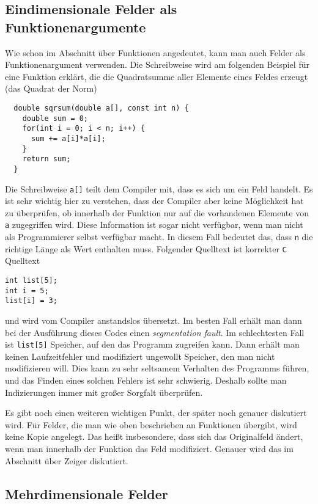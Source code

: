 \subsection{Eindimensionale Felder als Funktionenargumente}

Wie schon im Abschnitt über Funktionen angedeutet, kann man auch Felder als Funktionenargument verwenden.
Die Schreibweise wird am folgenden Beispiel für eine Funktion erklärt, die die Quadratsumme aller Elemente eines Feldes erzeugt (das Quadrat der Norm)
\begin{lstlisting}
  double sqrsum(double a[], const int n) {
    double sum = 0;
    for(int i = 0; i < n; i++) {
      sum += a[i]*a[i];
    }
    return sum;
  }
\end{lstlisting}
Die Schreibweise \texttt{a[]} teilt dem Compiler mit, dass es sich um ein Feld handelt.
Es ist sehr wichtig hier zu verstehen, dass der Compiler aber keine Möglichkeit hat zu überprüfen, ob innerhalb der Funktion nur auf die vorhandenen Elemente von \texttt{a} zugegriffen wird.
Diese Information ist sogar nicht verfügbar, wenn man nicht als Programmierer selbst verfügbar macht.
In diesem Fall bedeutet das, dass \texttt{n} die richtige Länge als Wert enthalten muss.
Folgender Quelltext ist korrekter \texttt{C} Quelltext
\begin{lstlisting}
int list[5];
int i = 5;
list[i] = 3;
\end{lstlisting}
und wird vom Compiler anstandslos übersetzt.
Im besten Fall erhält man dann bei der Ausführung dieses Codes einen \emph{segmentation fault}.
Im schlechtesten Fall ist \verb|list[5]| Speicher, auf den das Programm zugreifen kann.
Dann erhält man keinen Laufzeitfehler und modifiziert ungewollt Speicher, den man nicht modifizieren will.
Dies kann zu sehr seltsamem Verhalten des Programms führen, und das Finden eines solchen Fehlers ist sehr schwierig.
Deshalb sollte man Indizierungen immer mit großer Sorgfalt überprüfen.

Es gibt noch einen weiteren wichtigen Punkt, der später noch genauer diskutiert wird.
Für Felder, die man wie oben beschrieben an Funktionen übergibt, wird keine Kopie angelegt.
Das heißt insbesondere, dass sich das Originalfeld ändert, wenn man innerhalb der Funktion das Feld modifiziert.
Genauer wird das im Abschnitt über Zeiger diskutiert.

\subsection{Mehrdimensionale Felder}

